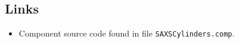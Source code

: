 \subsection*{Links}
\begin{itemize}
  \item Component source code found in file \texttt{SAXSCylinders.comp}.
\end{itemize}
